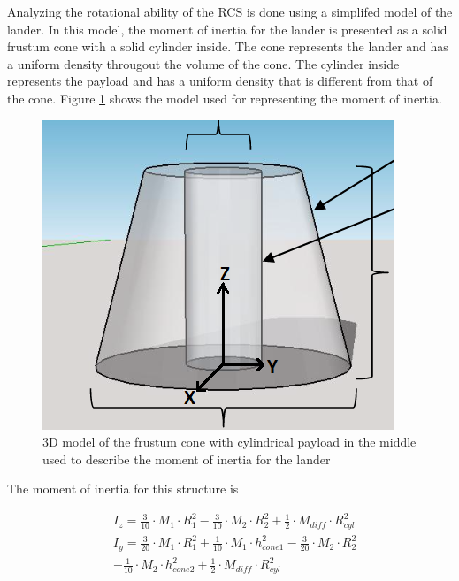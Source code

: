 Analyzing the rotational ability of the RCS is done using a simplifed model of the lander. In this model, the moment of inertia for the lander is presented as a solid frustum cone with a solid cylinder inside. The cone represents the lander and has a uniform density througout the volume of the cone. The cylinder inside represents the payload and has a uniform density that is different from that of the cone. Figure \ref{fig:cone} shows the model used for representing the moment of inertia.

\begin{figure}[htb]
\begin{center}
\includegraphics[scale=1]{figures/RCS/cone_payload}
\caption{3D model of the frustum cone with cylindrical payload in the middle used to describe the moment of inertia for the lander}
\label{fig:cone}
\end{center}
\end{figure}


The moment of inertia for this structure is

\begin{equation}
\begin{split}
   & I_{z} = \frac{3}{10} \cdot M_{1} \cdot R_{1}^2 - \frac{3}{10} \cdot M_{2} \cdot R_{2}^2 + \frac{1}{2} \cdot M_{diff} \cdot R_{cyl}^2\\
   & I_{y} = \frac{3}{20} \cdot M_{1} \cdot R_{1}^2 + \frac{1}{10} \cdot M_{1} \cdot h_{cone1}^2 - \frac{3}{20} \cdot M_{2} \cdot R_{2}^2\\
   &     - \frac{1}{10} \cdot M_{2} \cdot h_{cone2}^2 + \frac{1}{2} \cdot M_{diff} \cdot R_{cyl}^2
\end{split}
\end{equation}

